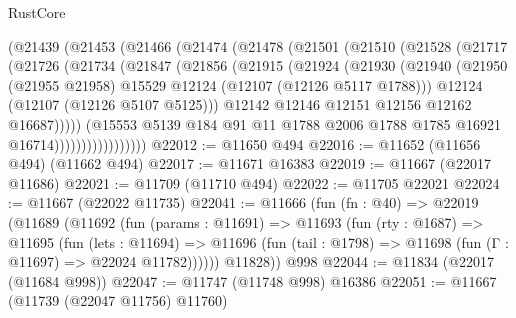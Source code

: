\begin{lexlean}{RustCore}
\begin{coremodule}
              (@21439
                (@21453
                  (@21466
                    (@21474
                      (@21478
                        (@21501
                          (@21510
                            (@21528
                              (@21717
                                (@21726
                                  (@21734
                                    (@21847
                                      (@21856
                                        (@21915
                                          (@21924
                                            (@21930
                                              (@21940
                                                (@21950
                                                  (@21955 @21958)
                                                  @15529
                                                  @12124
                                                  (@12107 (@12126 @5117 @1788)))
                                                @12124
                                                (@12107 (@12126 @5107 @5125)))
                                              @12142
                                              @12146
                                              @12151
                                              @12156
                                              @12162
                                              @16687)))))
                                    (@15553
                                      @5139
                                      @184
                                      @91
                                      @11
                                      @1788
                                      @2006
                                      @1788
                                      @1785
                                      @16921
                                      @16714)))))))))))))))))
@22012 := @11650 @494
@22016 := @11652 (@11656 @494) (@11662 @494)
@22017 := @11671 @16383
@22019 := @11667 (@22017 @11686)
@22021 := @11709 (@11710 @494)
@22022 := @11705 @22021
@22024 := @11667 (@22022 @11735)
@22041 := @11666
    (fun (fn : @40) =>
    @22019
      (@11689
        (@11692
          (fun (params : @11691) =>
          @11693
            (fun (rty : @1687) =>
            @11695
              (fun (lets : @11694) =>
              @11696 (fun (tail : @1798) => @11698 (fun (Γ : @11697) => @22024 @11782))))))
        @11828))
    @998
@22044 := @11834 (@22017 (@11684 @998))
@22047 := @11747 (@11748 @998) @16386
@22051 := @11667 (@11739 (@22047 @11756) @11760)

\end{coremodule}
\end{lexlean}
